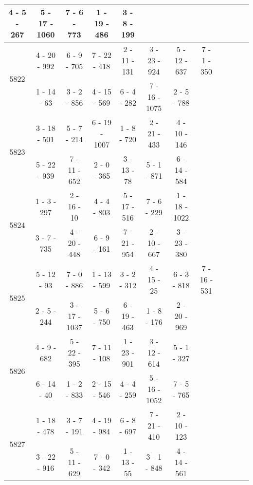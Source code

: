 \begin{longtable}{c | c | c | c | c | c | c | c | c | c | c | c}
4 - 5 - 267
&
5 - 17 - 1060
&
7 - 6 - 773
&
1 - 19 - 486
&
3 - 8 - 199
&\space\\\hline
\multirow{2}{*}{5822}
& 4 - 20 - 992
&
6 - 9 - 705
&
7 - 22 - 418
&
2 - 11 - 131
&
3 - 23 - 924
&
5 - 12 - 637
&
7 - 1 - 350
\\* \space
&
1 - 14 - 63
&
3 - 2 - 856
&
4 - 15 - 569
&
6 - 4 - 282
&
7 - 16 - 1075
&
2 - 5 - 788
&\space\\\hline
\multirow{2}{*}{5823}
& 3 - 18 - 501
&
5 - 7 - 214
&
6 - 19 - 1007
&
1 - 8 - 720
&
2 - 21 - 433
&
4 - 10 - 146
&\space\\* \space
&
5 - 22 - 939
&
7 - 11 - 652
&
2 - 0 - 365
&
3 - 13 - 78
&
5 - 1 - 871
&
6 - 14 - 584
&\space\\\hline
\multirow{2}{*}{5824}
& 1 - 3 - 297
&
2 - 16 - 10
&
4 - 4 - 803
&
5 - 17 - 516
&
7 - 6 - 229
&
1 - 18 - 1022
&\space\\* \space
&
3 - 7 - 735
&
4 - 20 - 448
&
6 - 9 - 161
&
7 - 21 - 954
&
2 - 10 - 667
&
3 - 23 - 380
&\space\\\hline
\multirow{2}{*}{5825}
& 5 - 12 - 93
&
7 - 0 - 886
&
1 - 13 - 599
&
3 - 2 - 312
&
4 - 15 - 25
&
6 - 3 - 818
&
7 - 16 - 531
\\* \space
&
2 - 5 - 244
&
3 - 17 - 1037
&
5 - 6 - 750
&
6 - 19 - 463
&
1 - 8 - 176
&
2 - 20 - 969
&\space\\\hline
\multirow{2}{*}{5826}
& 4 - 9 - 682
&
5 - 22 - 395
&
7 - 11 - 108
&
1 - 23 - 901
&
3 - 12 - 614
&
5 - 1 - 327
&\space\\* \space
&
6 - 14 - 40
&
1 - 2 - 833
&
2 - 15 - 546
&
4 - 4 - 259
&
5 - 16 - 1052
&
7 - 5 - 765
&\space\\\hline
\multirow{2}{*}{5827}
& 1 - 18 - 478
&
3 - 7 - 191
&
4 - 19 - 984
&
6 - 8 - 697
&
7 - 21 - 410
&
2 - 10 - 123
&\space\\* \space
&
3 - 22 - 916
&
5 - 11 - 629
&
7 - 0 - 342
&
1 - 13 - 55
&
3 - 1 - 848
&
4 - 14 - 561
&\space\\\hline

\end{longtable}
